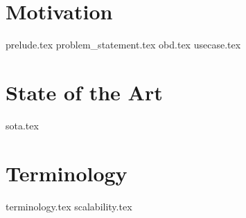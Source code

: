 \chapter{Motivation}\label{cha:motivation}
{prelude.tex}
{problem_statement.tex}
{obd.tex}
{usecase.tex}
\chapter{State of the Art}\label{cha:sota}
{sota.tex}
\chapter{Terminology}
{terminology.tex}
{scalability.tex}
